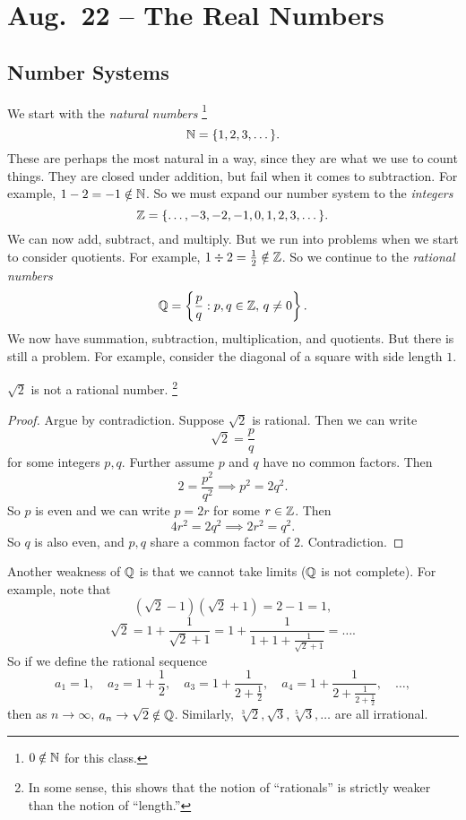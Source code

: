\chapter{Aug.~22 -- The Real Numbers}

\section{Number Systems}
We start with the \textit{natural numbers}
\footnote{$0 \notin \mathbb{N}$ for this class.}
\[\mathbb{N} = \{1, 2, 3, \dots\}.\]
These are perhaps
the most natural in a way, since they are what we use to
count things. They are closed under addition, but
fail when it comes to subtraction. For example,
$1 - 2 = -1 \notin \mathbb{N}$.
So we must expand our number system to the
\textit{integers}
\[\mathbb{Z} = \{\dots, -3, -2, -1, 0, 1, 2, 3, \dots\}.\]
We can now add, subtract, and
multiply. But we run into problems when we start to
consider quotients. For example,
$1 \div 2 = \frac{1}{2} \notin \mathbb{Z}$.
So we continue to the \textit{rational numbers}
\[\mathbb{Q} = \left\{\frac{p}{q} : p, q \in \mathbb{Z},\, q \ne 0\right\}.\]
We now have summation, subtraction,
multiplication, and quotients. But there is still a
problem. For example, consider the diagonal of a square
with side length $1$.

\begin{theorem}
  $\sqrt{2}$ is not a rational number. 
  \footnote{
    In some sense, this shows that the notion of
    ``rationals'' is strictly weaker than the notion of
    ``length.''
  }
\end{theorem}

\begin{proof}
  Argue by contradiction. Suppose $\sqrt{2}$ is rational.
  Then we can write
   \[
     \sqrt{2} = \frac{p}{q}
  \]
  for some integers $p, q$. Further assume $p$ and
  $q$ have no common factors. Then
  \[2 = \frac{p^2}{q^2} \implies p^2 = 2q^2.\]
  So $p$ is even and we can write $p = 2r$ for some
  $r \in \mathbb{Z}$. Then
  \[4r^2 = 2q^2 \implies 2r^2 = q^2.\]
  So $q$ is also even, and $p, q$ share a common factor
  of $2$. Contradiction.
\end{proof}

Another weakness of $\mathbb{Q}$ is that we cannot take limits
($\mathbb{Q}$ is not complete). For example, note that
\[(\sqrt{2} - 1)(\sqrt{2} + 1) = 2 - 1 = 1,\]
\[
  \sqrt{2} = 1 + \frac{1}{\sqrt{2} + 1}
  = 1 + \frac{1}{1 + 1 + \frac{1}{\sqrt{2} + 1}}
  = \dots
.\]
So if we define the rational sequence
\[
  a_1 = 1, \quad
  a_2 = 1 + \frac{1}{2}, \quad
  a_3 = 1 + \frac{1}{2 + \frac{1}{2}}, \quad
  a_4 = 1 + \frac{1}{2 + \frac{1}{2 + \frac{1}{2}}},
  \quad \dots
,\]
then as $n \to \infty$, $a_n \to \sqrt{2} \notin \mathbb{Q}$.
Similarly, $\sqrt[3]{2}, \sqrt{3}, \sqrt[5]{3}, \dots$
are all irrational.

